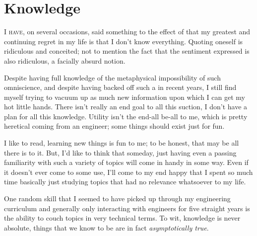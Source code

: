 \documentclass[../butidigress.tex]{subfiles}
\begin{document}
\chapter{Knowledge}\label{chap:knowledge}
\newpage

\lettrine{I}{ have}, on several occasions, said something to the effect of that my greatest and continuing regret in my life is that I don't know everything.
Quoting oneself is ridiculous and conceited; not to mention the fact that the sentiment expressed is also ridiculous, a facially absurd notion.

Despite having full knowledge of the metaphysical impossibility of such omniscience, and despite having backed off such a  in recent years, I still find myself trying to vacuum up as much new information upon which I can get my hot little hands.
There isn't really an end goal to all this suction, I don't have a plan for  all this knowledge.
Utility isn't the end-all be-all to me, which is pretty heretical coming from an engineer; some things should exist just for fun.

I like to read, learning new things is fun to me; to be honest, that may be all there is to it.
But, I'd like to think that someday, just having even a passing familiarity with such a variety of topics will come in handy in some way.
Even if it doesn't ever come to some use, I'll come to my end happy that I spent so much time basically just studying topics that had no relevance whatsoever to my life.

One random skill that I seemed to have picked up through my engineering curriculum and generally only interacting with engineers for five straight years is the ability to couch topics in very technical terms.
To wit, knowledge is never absolute, things that we know to be  are in fact \emph{asymptotically true}.
\end{document}
